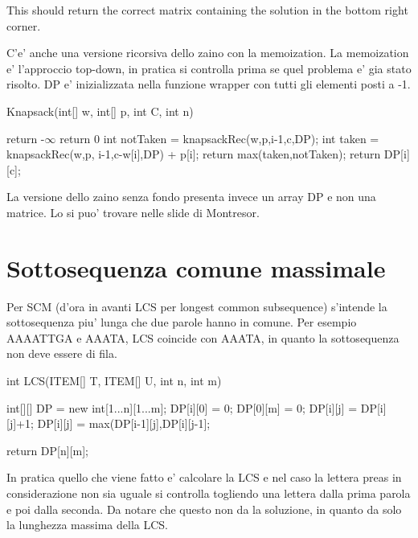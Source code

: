 \documentclass[oneside]{book}
\begin{document}
This should return the correct matrix containing the solution in the bottom right corner.

C'e' anche una versione ricorsiva dello zaino con la memoization. La memoization e' l'approccio top-down, in pratica si controlla prima se quel problema e' gia stato risolto. DP e' inizializzata nella funzione wrapper con tutti gli elementi posti a -1.

\begin{algorithm}
\caption{Knapsack(int[] w, int[] p, int C, int n)}\label{alg:cap}
\begin{algorithmic}
	\State return -$\infty$ 
	\State return 0
\Else
	\State {}
			\State int notTaken = knapsackRec(w,p,i-1,c,DP);
			\State int taken = knapsackRec(w,p, i-1,c-w[i],DP) + p[i];
			\State return max(taken,notTaken);
		\EndIf
	\EndIf
	\State return DP[i][c];

\end{algorithmic}
\end{algorithm}

La versione dello zaino senza fondo presenta invece un array DP e non una matrice. Lo si puo' trovare nelle slide di Montresor.


\section{Sottosequenza comune massimale}
Per SCM (d'ora in avanti LCS per longest common subsequence) s'intende la sottosequenza piu' lunga che due parole hanno in comune. Per esempio\\
AAAATTGA e AAATA, LCS coincide con AAATA, in quanto la sottosequenza non deve essere di fila.

\begin{algorithm}
\caption{int LCS(ITEM[] T, ITEM[] U, int n, int m)}\label{alg:cap}
\begin{algorithmic}
\State int[][] DP = new int[1...n][1...m];
	\State DP[i][0] = 0;
\EndFor
{}
	\State DP[0][m] = 0;
\EndFor
{}
			DP[i][j] = DP[i][j]+1;
			\Else
				\State DP[i][j] = max(DP[i-1][j],DP[i][j-1];
		\EndIf
	\EndFor
\EndFor

return DP[n][m];
\end{algorithmic}
\end{algorithm}

In pratica quello che viene fatto e' calcolare la LCS e nel caso la lettera preas in considerazione non sia uguale si controlla togliendo una lettera dalla prima parola e poi dalla seconda. Da notare che questo non da la soluzione, in quanto da solo la lunghezza massima della LCS.
\end{document}
